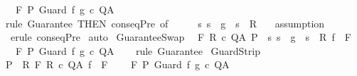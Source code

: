 \begin{isabellebody}
\ \ {\isasymLongrightarrow}\ {\isasymGamma}{\isacharcomma}{\isasymTheta}{\isasymturnstile}\isactrlbsub {\isacharslash}F\isactrlesub \ P\ {\isacharparenleft}Guard\ f\ g\ c{\isacharparenright}\ Q{\isacharcomma}A{\isachardoublequoteclose}\isanewline
%
\isadelimproof
%
\endisadelimproof
%
\isatagproof
{}\isamarkupfalse%
\ {\isacharparenleft}rule\ Guarantee\ {\isacharbrackleft}THEN\ conseqPre{\isacharcomma}\ of\ {\isacharunderscore}\ {\isacharunderscore}\ {\isacharunderscore}\ {\isacharunderscore}\ {\isacharunderscore}\ {\isachardoublequoteopen}{\isacharbraceleft}s{\isachardot}\ s\ {\isasymin}\ g\ {\isasymlongrightarrow}\ s\ {\isasymin}\ R{\isacharbraceright}{\isachardoublequoteclose}{\isacharbrackright}{\isacharparenright}\isanewline
{}\isamarkupfalse%
\ \ \ assumption\isanewline
{}\isamarkupfalse%
\ \ {\isacharparenleft}erule\ conseqPre{\isacharparenright}\isanewline
{}\isamarkupfalse%
\ auto\isanewline
{}\isamarkupfalse%
%
\endisatagproof
{\isafoldproof}%
%
\isadelimproof
\isanewline
%
\endisadelimproof
\isanewline
{}\isamarkupfalse%
\ GuaranteeSwap{\isacharcolon}\isanewline
\ {\isachardoublequoteopen}{\isasymlbrakk}\ {\isasymGamma}{\isacharcomma}{\isasymTheta}{\isasymturnstile}\isactrlbsub {\isacharslash}F\isactrlesub \ R\ c\ Q{\isacharcomma}A{\isacharsemicolon}\ P\ {\isasymsubseteq}\ {\isacharbraceleft}s{\isachardot}\ s\ {\isasymin}\ g\ {\isasymlongrightarrow}\ s\ {\isasymin}\ R{\isacharbraceright}{\isacharsemicolon}\ f\ {\isasymin}\ F{\isasymrbrakk}\ \isanewline
\ \ {\isasymLongrightarrow}\ {\isasymGamma}{\isacharcomma}{\isasymTheta}{\isasymturnstile}\isactrlbsub {\isacharslash}F\isactrlesub \ P\ {\isacharparenleft}Guard\ f\ g\ c{\isacharparenright}\ Q{\isacharcomma}A{\isachardoublequoteclose}\isanewline
%
\isadelimproof
\ \ %
\endisadelimproof
%
\isatagproof
{}\isamarkupfalse%
\ {\isacharparenleft}rule\ Guarantee{\isacharparenright}%
\endisatagproof
{\isafoldproof}%
%
\isadelimproof
\isanewline
%
\endisadelimproof
\isanewline
{}\isamarkupfalse%
\ GuardStrip{\isacharcolon}\isanewline
\ {\isachardoublequoteopen}{\isasymlbrakk}P\ {\isasymsubseteq}\ R{\isacharsemicolon}\ {\isasymGamma}{\isacharcomma}{\isasymTheta}{\isasymturnstile}\isactrlbsub {\isacharslash}F\isactrlesub \ R\ c\ Q{\isacharcomma}A{\isacharsemicolon}\ f\ {\isasymin}\ F{\isasymrbrakk}\ \isanewline
\ \ {\isasymLongrightarrow}\ {\isasymGamma}{\isacharcomma}{\isasymTheta}{\isasymturnstile}\isactrlbsub {\isacharslash}F\isactrlesub \ P\ {\isacharparenleft}Guard\ f\ g\ c{\isacharparenright}\ Q{\isacharcomma}A{\isachardoublequoteclose}\isanewline

\end{isabellebody}
